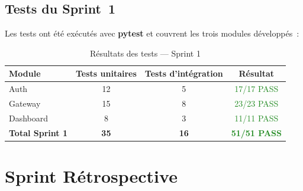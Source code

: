 \subsection{Tests du Sprint~1}

Les tests ont été exécutés avec \textbf{pytest} et couvrent les trois modules développés~:

\begin{table}[H]
\centering
\caption{Résultats des tests --- Sprint 1}
\label{tab:tests_s1}
\begin{tabular}{|l|c|c|c|}
\hline
\textbf{Module} & \textbf{Tests unitaires} & \textbf{Tests d'intégration} & \textbf{Résultat} \\
\hline
Auth & 12 & 5 & \textcolor{ForestGreen}{17/17 PASS} \\
\hline
Gateway & 15 & 8 & \textcolor{ForestGreen}{23/23 PASS} \\
\hline
Dashboard & 8 & 3 & \textcolor{ForestGreen}{11/11 PASS} \\
\hline
\textbf{Total Sprint 1} & \textbf{35} & \textbf{16} & \textcolor{ForestGreen}{\textbf{51/51 PASS}} \\
\hline
\end{tabular}
\end{table}


\section{Sprint Rétrospective}
\label{sec:s1_retro}

